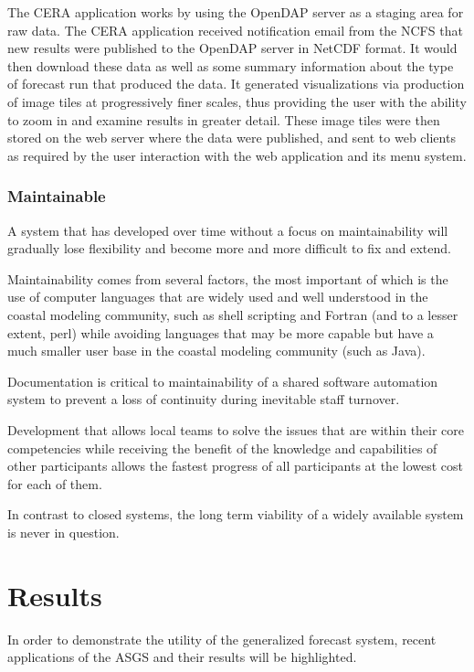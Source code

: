 \documentclass[12pt]{article}
\begin{document}
The CERA application works by using the OpenDAP server as a staging 
area for raw data. The CERA application received notification email 
from the NCFS that new results were published to the OpenDAP server 
in NetCDF format. It would then download these data as well as some 
summary information about the type of forecast run that produced the 
data. It generated visualizations via production of image tiles at 
progressively finer scales, thus providing the user with the ability 
to zoom in and examine results in greater detail. These image tiles 
were then stored on the web server where the data were published, 
and sent to web clients as required by the user interaction with the 
web application and its menu system.

\subsubsection{Maintainable}

A system that has developed over time without a focus on 
maintainability will gradually lose flexibility and become more and 
more difficult to fix and extend. 

Maintainability comes from several factors, the most important of 
which is the use of computer languages that are widely used and well 
understood in the coastal modeling community, such as shell 
scripting and Fortran (and to a lesser extent, perl) while avoiding 
languages that may be more capable but have a much smaller user base 
in the coastal modeling community (such as Java).  

Documentation is critical to maintainability of a shared software 
automation system to prevent a loss of continuity during inevitable 
staff turnover.

Development that allows local teams to solve the issues that are 
within their core competencies while receiving the benefit of the 
knowledge and capabilities of other participants allows the fastest
progress of all participants at the lowest cost for each of them.

In contrast to closed systems, the long term viability of a widely
available system is never in question.  

\section{Results}

In order to demonstrate the utility of the generalized forecast 
system, recent applications of the ASGS and their results will be 
highlighted.
\end{document}
